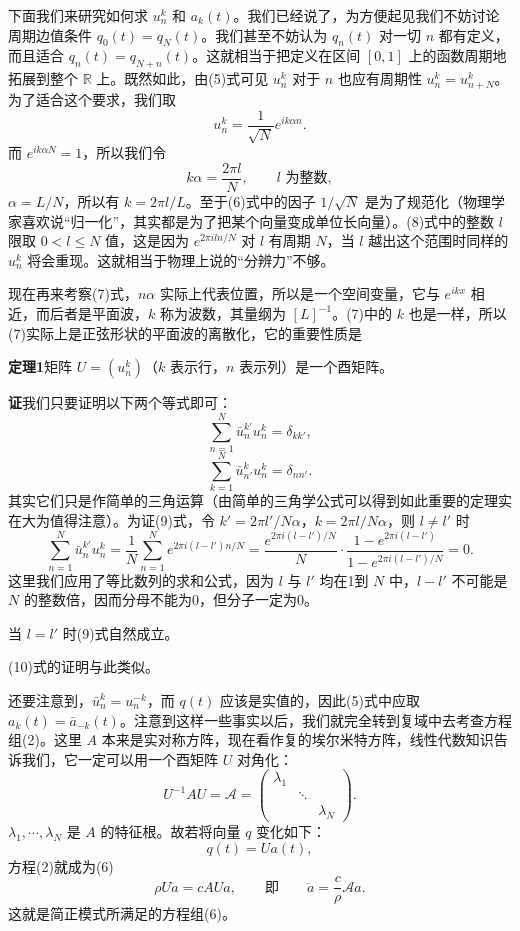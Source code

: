 下面我们来研究如何求 $u_n^k$ 和 $a_k(t)$。我们已经说了，为方便起见我们不妨讨论周期边值条件 $q_0(t)=q_N(t)$。我们甚至不妨认为 $q_n(t)$ 对一切 $n$ 都有定义，而且适合 $q_n(t)=q_{N+n}(t)$。这就相当于把定义在区间 $[0,1]$ 上的函数周期地拓展到整个 $\mathbb R$ 上。既然如此，由(5)式可见 $u_n^k$ 对于 $n$ 也应有周期性 $u_n^k=u_{n+N}^k$。为了适合这个要求，我们取
\begin{equation}
 u_n^k=\frac1{\sqrt N}e^{ik\alpha n}.
 \tag{7}
\end{equation}
而 $e^{ik\alpha N}=1$，所以我们令
\begin{equation}
 k\alpha=\frac{2\pi l}{N},\qquad l\text{ 为整数},
 \tag{8}
\end{equation}
$\alpha=L/N$，所以有 $k=2\pi l/L$。至于(6)式中的因子 $1/\sqrt N$ 是为了规范化（物理学家喜欢说“归一化”，其实都是为了把某个向量变成单位长向量）。(8)式中的整数 $l$ 限取 $0<l\le N$ 值，这是因为 $e^{2\pi i l n/N}$ 对 $l$ 有周期 $N$，当 $l$ 越出这个范围时同样的 $u_n^k$ 将会重现。这就相当于物理上说的“分辨力”不够。

现在再来考察(7)式，$n\alpha$ 实际上代表位置，所以是一个空间变量，它与 $e^{ikx}$ 相近，而后者是平面波，$k$ 称为波数，其量纲为 $[L]^{-1}$。(7)中的 $k$ 也是一样，所以(7)实际上是正弦形状的平面波的离散化，它的重要性质是

\noindent\textbf{定理1}\quad 矩阵 $U=(u_n^k)$（$k$ 表示行，$n$ 表示列）是一个酉矩阵。

\noindent\textbf{证}\quad 我们只要证明以下两个等式即可：
\begin{equation}
 \sum_{n=1}^N \bar u_n^{k'}u_n^k=\delta_{kk'},
 \tag{9}
\end{equation}
\begin{equation}
 \sum_{k=1}^N \bar u_{n'}^k u_n^k=\delta_{nn'}.
 \tag{10}
\end{equation}
其实它们只是作简单的三角运算（由简单的三角学公式可以得到如此重要的定理实在大为值得注意）。为证(9)式，令 $k'=2\pi l'/N\alpha$，$k=2\pi l/N\alpha$，则 $l\ne l'$ 时
\[
 \sum_{n=1}^N \bar u_n^{k'}u_n^k
 =\frac1N\sum_{n=1}^N e^{2\pi i(l-l')n/N}
 =\frac{e^{2\pi i(l-l')/N}}N\cdot\frac{1-e^{2\pi i(l-l')}}{1-e^{2\pi i(l-l')/N}}=0.
\]
这里我们应用了等比数列的求和公式，因为 $l$ 与 $l'$ 均在1到 $N$ 中，$l-l'$ 不可能是 $N$ 的整数倍，因而分母不能为0，但分子一定为0。

当 $l=l'$ 时(9)式自然成立。

(10)式的证明与此类似。

还要注意到，$\bar u_n^k=u_n^{-k}$，而 $q(t)$ 应该是实值的，因此(5)式中应取 $a_k(t)=\bar a_{-k}(t)$。注意到这样一些事实以后，我们就完全转到复域中去考查方程组(2)。这里 $A$ 本来是实对称方阵，现在看作复的埃尔米特方阵，线性代数知识告诉我们，它一定可以用一个酉矩阵 $U$ 对角化：
\[
 U^{-1}AU=\mathcal A=
 \begin{pmatrix}
 \lambda_1&&\\
 &\ddots&\\
 &&\lambda_N
 \end{pmatrix}.
\]
$\lambda_1,\cdots,\lambda_N$ 是 $A$ 的特征根。故若将向量 $q$ 变化如下：
\[
 q(t)=Ua(t),
\]
方程(2)就成为(6)
\[
 \rho U\ddot a=cAUa,\qquad \text{即}\qquad \ddot a=\frac{c}{\rho}\mathcal A a.
\]
这就是简正模式所满足的方程组(6)。


